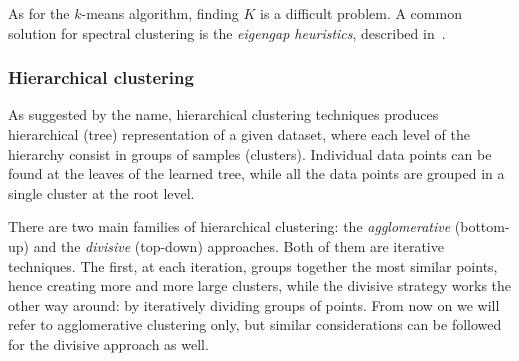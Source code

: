 	As for the $k$-means algorithm, finding $K$ is a difficult problem. A common solution for spectral clustering is the \textit{eigengap heuristics}, described in~\cite{von2007tutorial}.
    
    \subsubsection{Hierarchical clustering} \label{sec:hierarchical_clustering}
	As suggested by the name, hierarchical clustering techniques produces hierarchical (tree) representation of a given dataset, where each level of the hierarchy consist in groups of samples (clusters). Individual data points can be found at the leaves of the learned tree, while all the data points are grouped in a single cluster at the root level.
	
	There are two main families of hierarchical clustering: the \textit{agglomerative} (bottom-up) and the \textit{divisive} (top-down) approaches.
	Both of them are iterative techniques. The first, at each iteration, groups together the most similar points, hence creating more and more large clusters, while the divisive strategy works the other way around: by iteratively dividing groups of points. From now on we will refer to agglomerative clustering only, but similar considerations can be followed for the divisive approach as well.
	
